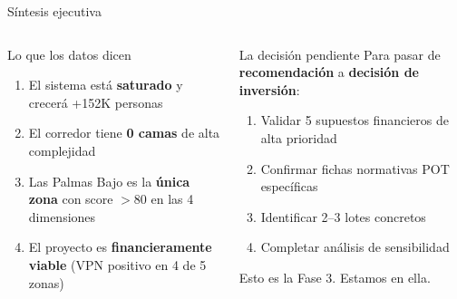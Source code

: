 \documentclass[aspectratio=169, 11pt]{beamer}
\begin{document}
{\begin{frame}{Síntesis ejecutiva}
\vspace{8pt}
\begin{columns}[T]
\begin{exampleblock}{\small Lo que los datos dicen}
\footnotesize
\begin{enumerate}
  \item El sistema está \textbf{saturado} y crecerá +152K personas
  \item El corredor tiene \textbf{0 camas} de alta complejidad
  \item Las Palmas Bajo es la \textbf{única zona} con score $>$80 en las 4 dimensiones
  \item El proyecto es \textbf{financieramente viable} (VPN positivo en 4 de 5 zonas)
\end{enumerate}
\end{exampleblock}

\begin{alertblock}{\small La decisión pendiente}
\footnotesize Para pasar de \textbf{recomendación} a \textbf{decisión de inversión}:

\vspace{3pt}
\begin{enumerate}
  \item Validar 5 supuestos financieros de alta prioridad
  \item Confirmar fichas normativas POT específicas
  \item Identificar 2--3 lotes concretos
  \item Completar análisis de sensibilidad
\end{enumerate}

\vspace{3pt}
{\scriptsize Esto es la Fase 3. Estamos en ella.}
\end{alertblock}
\end{columns}
\end{frame}
}
\end{document}

